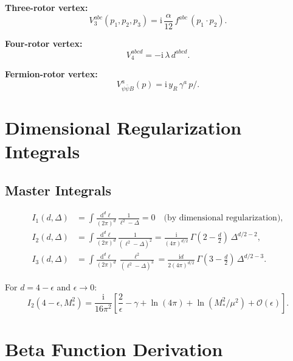 \documentclass[11pt,a4paper]{article}
\numberwithin{equation}{section}
\theoremstyle{plain}
\theoremstyle{definition}
\theoremstyle{remark}
\newcommand{\dd}{\mathrm{d}}
\newcommand{\ii}{\mathrm{i}}
\begin{document}
\textbf{Three-rotor vertex:}
\begin{equation}
V_3^{abc}(p_1,p_2,p_3) = \ii\,\frac{\alpha}{12}\,f^{abc}\,(p_1\cdot p_2).
\label{eq:V3-summary}
\end{equation}

\textbf{Four-rotor vertex:}
\begin{equation}
V_4^{abcd} = -\ii\,\lambda\,d^{abcd}.
\label{eq:V4-summary}
\end{equation}

\textbf{Fermion-rotor vertex:}
\begin{equation}
V_{\psi\bar\psi B}^a(p) = \ii\,y_R\,\gamma^a\,p\!\!\!/.
\label{eq:V-fermion-summary}
\end{equation}

\section{Dimensional Regularization Integrals}\label{app:integrals}

\subsection{Master Integrals}

\begin{align}
I_1(d,\Delta) &= \int \frac{\dd^d \ell}{(2\pi)^d}\,\frac{1}{\ell^2-\Delta} = 0 \quad\text{(by dimensional regularization)}, \label{eq:I1-master}\\
I_2(d,\Delta) &= \int \frac{\dd^d \ell}{(2\pi)^d}\,\frac{1}{(\ell^2-\Delta)^2} = \frac{\ii}{(4\pi)^{d/2}}\,\Gamma\left(2-\frac{d}{2}\right)\,\Delta^{d/2-2}, \label{eq:I2-master}\\
I_3(d,\Delta) &= \int \frac{\dd^d \ell}{(2\pi)^d}\,\frac{\ell^2}{(\ell^2-\Delta)^3} = \frac{\ii d}{2(4\pi)^{d/2}}\,\Gamma\left(3-\frac{d}{2}\right)\,\Delta^{d/2-3}. \label{eq:I3-master}
\end{align}

For $d=4-\epsilon$ and $\epsilon\to 0$:
\begin{equation}
I_2(4-\epsilon,M_*^2) = \frac{\ii}{16\pi^2}\left[\frac{2}{\epsilon} - \gamma + \ln(4\pi) + \ln(M_*^2/\mu^2) + \mathcal{O}(\epsilon)\right].
\label{eq:I2-d4}
\end{equation}

\section{Beta Function Derivation}\label{app:beta}
\end{document}
